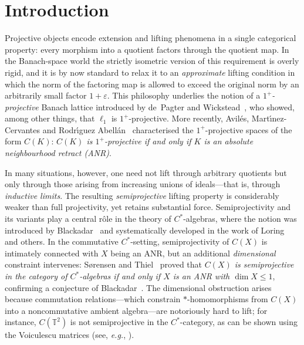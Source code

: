 \documentclass[11pt]{amsart}
\renewcommand{\le}{\leqslant}
\numberwithin{equation}{section}
\theoremstyle{definition}
\theoremstyle{remark}
\theoremstyle{plain}
\begin{document}
\section{Introduction}\label{sec:intro}

Projective objects encode extension and lifting phenomena in a single categorical property:
every morphism into a quotient factors through the quotient map.
In the Banach-space world the strictly isometric version of this requirement
is overly rigid, and it is by now standard to relax it to an \emph{approximate} lifting condition
in which the norm of the factoring map is allowed to exceed the original norm
by an arbitrarily small factor $1+\varepsilon$.
This philosophy underlies the notion of a \emph{$1^+$-projective} Banach lattice introduced by
de~Pagter and Wickstead~\cite{dpw}, who showed, among other things,
that $\ell_1$ is $1^+$-projective.
More recently, Avil\'es, Mart\'{\i}nez-Cervantes and Rodr\'{\i}guez Abell\'an~\cite{avilaes2020}
characterised the $1^+$-projective spaces of the form $C(K)$:
\emph{$C(K)$ is $1^+$-projective if and only if $K$ is an absolute neighbourhood retract (ANR)}.

In many situations, however, one need not lift through arbitrary quotients
but only through those arising from increasing unions of ideals---that is, through
\emph{inductive limits}.
The resulting \emph{semiprojective} lifting property is considerably weaker than full projectivity,
yet retains substantial force.
Semiprojectivity and its variants play a central r\^ole in the theory of
$C^*$-algebras, where the notion was introduced by Blackadar~\cite{blackadar85}
and systematically developed in the work of Loring~\cite{loring} and others.
In the commutative $C^*$-setting,
semiprojectivity of $C(X)$ is intimately connected with $X$ being an ANR,
but an additional \emph{dimensional} constraint intervenes:
S\o rensen and Thiel~\cite{sorensen-thiel} proved that
\emph{$C(X)$ is semiprojective in the category of $C^*$-algebras
if and only if $X$ is an ANR with $\dim X\le 1$},
confirming a conjecture of Blackadar~\cite[p.~24]{blackadar-survey}.
The dimensional obstruction arises because commutation relations---which constrain $*$-homomorphisms
from $C(X)$ into a noncommutative ambient algebra---are notoriously hard to lift;
for instance, $C(\mathbb T^2)$ is not semiprojective in the $C^*$-category,
as can be shown using the Voiculescu matrices (see, \emph{e.g.},
\cite[p.~23]{blackadar-survey}).
\end{document}
